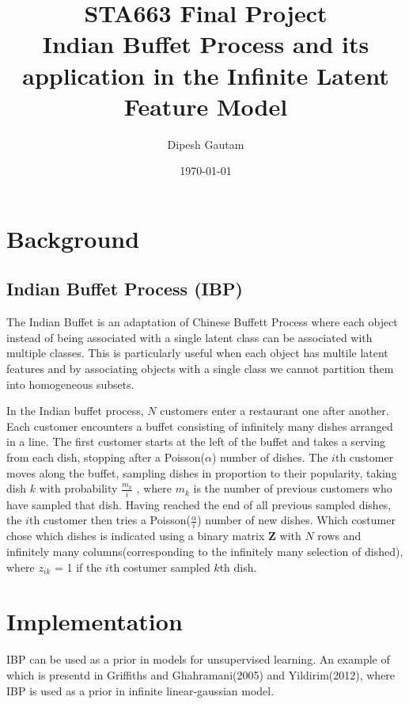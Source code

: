 \documentclass{article}
\begin{document}
\title{STA663 Final Project \\ Indian Buffet Process and its application in the Infinite Latent Feature Model}
\author{Dipesh Gautam}
\date{\today}
\maketitle

\section{Background}
\subsection{Indian Buffet Process (IBP)}
The Indian Buffet is an adaptation of Chinese Buffett Process where each object instead of being associated with a single latent class can  be associated with multiple classes. This is particularly useful when each object has multile latent features and by associating objects with a single class we cannot partition them into homogeneous subsets.

In the Indian buffet process, $N$ customers enter a restaurant one after another. Each customer encounters a buffet 
consisting of infinitely many dishes arranged in a line. The first customer starts at the left of the buffet and 
takes a serving from each dish, stopping after a Poisson($\alpha$) number of dishes. The $i$th customer moves along the buffet, 
sampling dishes in proportion to their popularity, taking dish $k$ with probability $\frac{m_k}{i}$ , where $m_k$ is the number of 
previous customers who have sampled that dish. Having reached the end of all previous sampled dishes, the $i$th customer 
then tries a Poisson($\frac{\alpha}{i}$) number of new dishes. Which costumer chose which dishes is indicated using a binary matrix \textbf{Z} with $N$ rows and infinitely many columns(corresponding to the infinitely many selection of dished), where $z_{ik}$ = 1 if the $i$th costumer sampled $k$th dish.


\section{Implementation}
IBP can be used as a prior in models for unsupervised learning. An example of which is presentd in Griffiths and Ghahramani(2005) and Yildirim(2012), where IBP is used as a prior in infinite linear-gaussian model.
\end{document}
